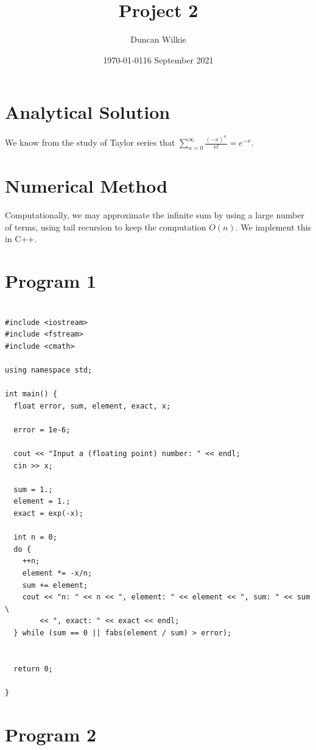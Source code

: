 \documentclass[11pt]{article}
\date{\today}
\title{}
\begin{document}
\title{Project 2}
\author{Duncan Wilkie}
\date{16 September 2021}

\maketitle

\section{Analytical Solution}
\label{sec:orgf4520d7}

We know from the study of Taylor series that \(\sum_{n=0}^\infty\frac{(-x)^n}{n!} = e^{-x}\). 

\section{Numerical Method}
\label{sec:org8e56bb6}

Computationally, we may approximate the infinite sum by using a large number of terms, using tail recursion to keep the computation \(O(n)\). We implement this in C++.

\section{Program 1}
\label{sec:org517aaca}

\begin{verbatim}

#include <iostream>
#include <fstream>
#include <cmath>

using namespace std;

int main() {
  float error, sum, element, exact, x;

  error = 1e-6;

  cout << "Input a (floating point) number: " << endl;
  cin >> x;

  sum = 1.;
  element = 1.;
  exact = exp(-x);

  int n = 0;
  do {
    ++n;
    element *= -x/n;
    sum += element;
    cout << "n: " << n << ", element: " << element << ", sum: " << sum \
        << ", exact: " << exact << endl;
  } while (sum == 0 || fabs(element / sum) > error);


  return 0;

}

\end{verbatim}

\section{Program 2}
\label{sec:org2b59d8a}
\end{document}
